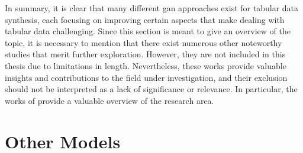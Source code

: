 In summary, it is clear that many different \gls{gan} approaches exist for tabular data synthesis, each focusing on improving certain aspects that make dealing with tabular data challenging.
Since this section is meant to give an overview of the topic, 
it is necessary to mention that there exist numerous other noteworthy studies that merit further exploration. 
However, they are not included in this thesis due to limitations in length. 
Nevertheless, these works provide valuable insights and contributions to the field under investigation, and their exclusion should not be interpreted as a lack of significance or relevance. 
In particular, the works of \textcite{fan2020RelationalDataSynthesisa, hernandez2022SyntheticDataGeneration, bourou2021ReviewTabularData} provide a valuable overview of the research area.


\section{Other Models}
\label{ch:relatedWork-Other Models}

